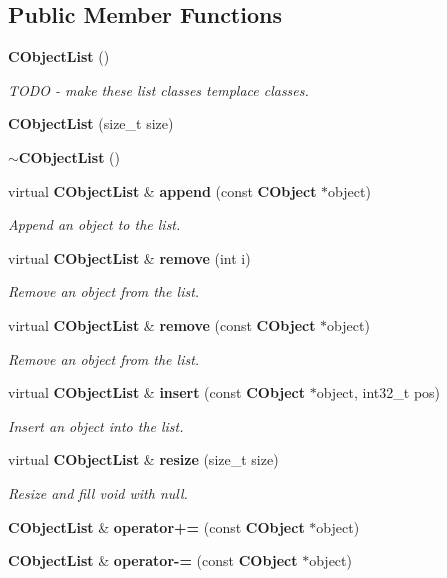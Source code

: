 \subsection*{Public Member Functions}
\begin{DoxyCompactItemize}
\item 
{\bf C\-Object\-List} ()
\begin{DoxyCompactList}\small\item\em T\-O\-D\-O -\/ make these list classes templace classes. \end{DoxyCompactList}\item 
{\bf C\-Object\-List} (size\-\_\-t size)
\item 
{\bf $\sim$\-C\-Object\-List} ()
\item 
virtual {\bf C\-Object\-List} \& {\bf append} (const {\bf C\-Object} $\ast$object)
\begin{DoxyCompactList}\small\item\em Append an object to the list. \end{DoxyCompactList}\item 
virtual {\bf C\-Object\-List} \& {\bf remove} (int i)
\begin{DoxyCompactList}\small\item\em Remove an object from the list. \end{DoxyCompactList}\item 
virtual {\bf C\-Object\-List} \& {\bf remove} (const {\bf C\-Object} $\ast$object)
\begin{DoxyCompactList}\small\item\em Remove an object from the list. \end{DoxyCompactList}\item 
virtual {\bf C\-Object\-List} \& {\bf insert} (const {\bf C\-Object} $\ast$object, int32\-\_\-t pos)
\begin{DoxyCompactList}\small\item\em Insert an object into the list. \end{DoxyCompactList}\item 
virtual {\bf C\-Object\-List} \& {\bf resize} (size\-\_\-t size)
\begin{DoxyCompactList}\small\item\em Resize and fill void with null. \end{DoxyCompactList}\item 
{\bf C\-Object\-List} \& {\bf operator+=} (const {\bf C\-Object} $\ast$object)
\item 
{\bf C\-Object\-List} \& {\bf operator-\/=} (const {\bf C\-Object} $\ast$object)

\end{DoxyCompactItemize}
